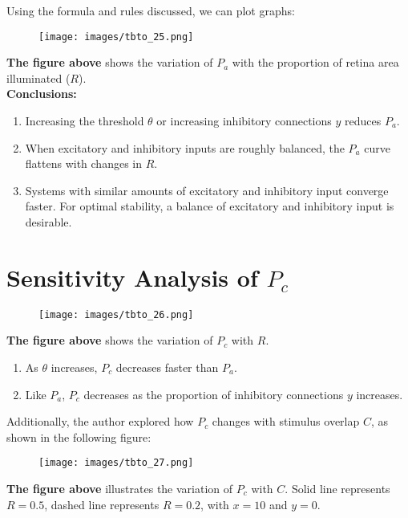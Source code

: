 \documentclass[11p,oneside]{book}
\begin{document}
Using the formula and rules discussed, we can plot graphs:

\begin{figure}[H]
    \centering
    \texttt{[image: images/tbto\_25.png]}
\end{figure}

\textbf{The figure above} shows the variation of $P_a$ with the proportion of retina area illuminated ($R$). \\

\textbf{Conclusions:}
\begin{enumerate}
    \item Increasing the threshold $\theta$ or increasing inhibitory connections $y$ reduces $P_a$.
    \item When excitatory and inhibitory inputs are roughly balanced, the $P_a$ curve flattens with changes in $R$.
    \item Systems with similar amounts of excitatory and inhibitory input converge faster. For optimal stability, a balance of excitatory and inhibitory input is desirable.
\end{enumerate}

\section*{Sensitivity Analysis of $P_c$}

\begin{figure}[H]
    \centering
    \texttt{[image: images/tbto\_26.png]}
\end{figure}

\textbf{The figure above} shows the variation of $P_c$ with $R$. \\

\begin{enumerate}
    \item As $\theta$ increases, $P_c$ decreases faster than $P_a$.
    \item Like $P_a$, $P_c$ decreases as the proportion of inhibitory connections $y$ increases.
\end{enumerate}

Additionally, the author explored how $P_c$ changes with stimulus overlap $C$, as shown in the following figure:

\begin{figure}[H]
    \centering
    \texttt{[image: images/tbto\_27.png]}
\end{figure}

\textbf{The figure above} illustrates the variation of $P_c$ with $C$. Solid line represents $R=0.5$, dashed line represents $R=0.2$, with $x=10$ and $y=0$. \\
\end{document}
